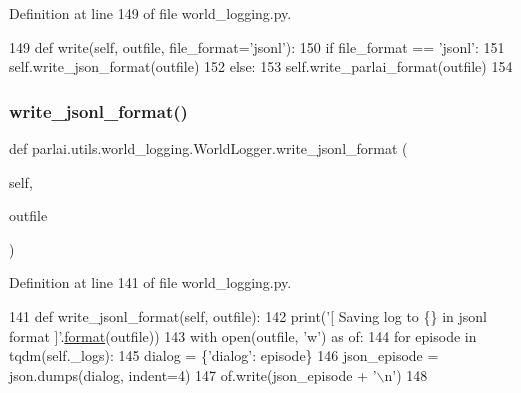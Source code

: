 Definition at line 149 of file world\+\_\+logging.\+py.


\begin{DoxyCode}
149     \textcolor{keyword}{def }write(self, outfile, file\_format='jsonl'):
150         \textcolor{keywordflow}{if} file\_format == \textcolor{stringliteral}{'jsonl'}:
151             self.write\_json\_format(outfile)
152         \textcolor{keywordflow}{else}:
153             self.write\_parlai\_format(outfile)
154 \end{DoxyCode}
\mbox{\label{classparlai_1_1utils_1_1world__logging_1_1WorldLogger_a89f41f54a257d6f2c5fbae6a710d8b44}} 
\subsubsection{\texorpdfstring{write\+\_\+jsonl\+\_\+format()}{write\_jsonl\_format()}}
{\footnotesize\ttfamily def parlai.\+utils.\+world\+\_\+logging.\+World\+Logger.\+write\+\_\+jsonl\+\_\+format (\begin{DoxyParamCaption}\item[{}]{self,  }\item[{}]{outfile }\end{DoxyParamCaption})}



Definition at line 141 of file world\+\_\+logging.\+py.


\begin{DoxyCode}
141     \textcolor{keyword}{def }write\_jsonl\_format(self, outfile):
142         print(\textcolor{stringliteral}{'[ Saving log to \{\} in jsonl format ]'}.\hyperlink{namespaceparlai_1_1chat__service_1_1services_1_1messenger_1_1shared__utils_a32e2e2022b824fbaf80c747160b52a76}{format}(outfile))
143         with open(outfile, \textcolor{stringliteral}{'w'}) \textcolor{keyword}{as} of:
144             \textcolor{keywordflow}{for} episode \textcolor{keywordflow}{in} tqdm(self.\_logs):
145                 dialog = \{\textcolor{stringliteral}{'dialog'}: episode\}
146                 json\_episode = json.dumps(dialog, indent=4)
147                 of.write(json\_episode + \textcolor{stringliteral}{'\(\backslash\)n'})
148 
\end{DoxyCode}
\mbox{\label{classparlai_1_1utils_1_1world__logging_1_1WorldLogger_a9a5210ac32adcaec88d4b33265cbba92}} 
